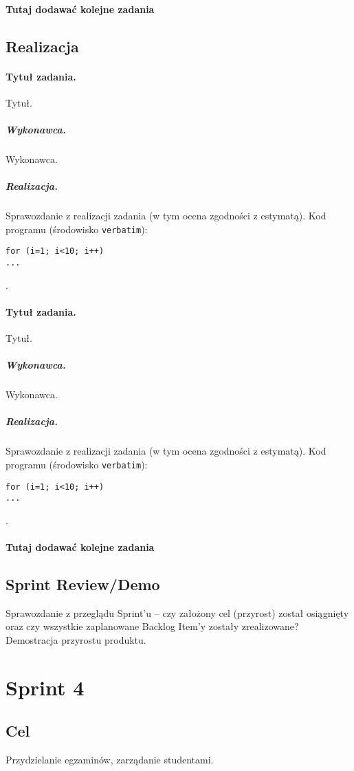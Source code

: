 \documentclass[a4paper]{article}
\begin{document}
\paragraph{Tutaj dodawać kolejne zadania}

\subsection{Realizacja}

\paragraph{Tytuł zadania.} Tytuł.
\subparagraph{Wykonawca.} Wykonawca.
\subparagraph{Realizacja.} Sprawozdanie z realizacji zadania (w tym ocena zgodności z estymatą). Kod programu (środowisko \texttt{verbatim}): \begin{verbatim}
for (i=1; i<10; i++)
...
\end{verbatim}.

\paragraph{Tytuł zadania.} Tytuł.
\subparagraph{Wykonawca.} Wykonawca.
\subparagraph{Realizacja.} Sprawozdanie z realizacji zadania (w tym ocena zgodności z estymatą). Kod programu (środowisko \texttt{verbatim}): \begin{verbatim}
for (i=1; i<10; i++)
...
\end{verbatim}.

\paragraph{Tutaj dodawać kolejne zadania}


\subsection{Sprint Review/Demo}
Sprawozdanie z przeglądu Sprint'u -- czy założony cel (przyrost) został osiągnięty oraz czy wszystkie zaplanowane Backlog Item'y zostały zrealizowane? Demostracja przyrostu produktu.

\section{Sprint 4}

\subsection{Cel} Przydzielanie egzaminów, zarządanie studentami.
\end{document}
